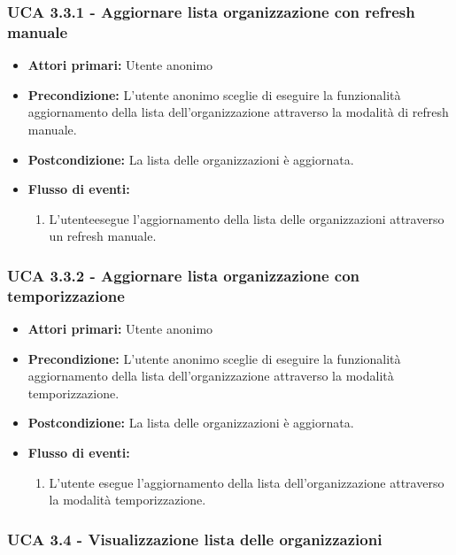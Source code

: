 \subsubsection{UCA 3.3.1 - Aggiornare lista organizzazione con refresh manuale}%
\begin{itemize}
	\item \textbf{Attori primari:} Utente anonimo
	\item \textbf{Precondizione:} L'utente anonimo sceglie di eseguire la funzionalità aggiornamento della lista dell'organizzazione attraverso la modalità di refresh manuale.
	\item \textbf{Postcondizione:} La lista delle organizzazioni è aggiornata.
	\item \textbf{Flusso di eventi:}
	\begin{enumerate}
		\item L'utenteesegue l'aggiornamento della lista delle organizzazioni attraverso un refresh manuale.
	\end{enumerate}
	
\end{itemize}

\subsubsection{UCA 3.3.2 - Aggiornare lista organizzazione con temporizzazione}%
\begin{itemize} 
	\item \textbf{Attori primari:} Utente anonimo
	\item \textbf{Precondizione:} L'utente anonimo sceglie di eseguire la funzionalità aggiornamento della lista dell'organizzazione attraverso la modalità temporizzazione.
	\item \textbf{Postcondizione:} La lista delle organizzazioni è aggiornata.
	\item \textbf{Flusso di eventi:}
	\begin{enumerate}
		\item L'utente esegue l'aggiornamento della lista dell'organizzazione attraverso la modalità temporizzazione.
	\end{enumerate}
\end{itemize}

\clearpage


\subsubsection{UCA 3.4 - Visualizzazione lista delle organizzazioni}%

